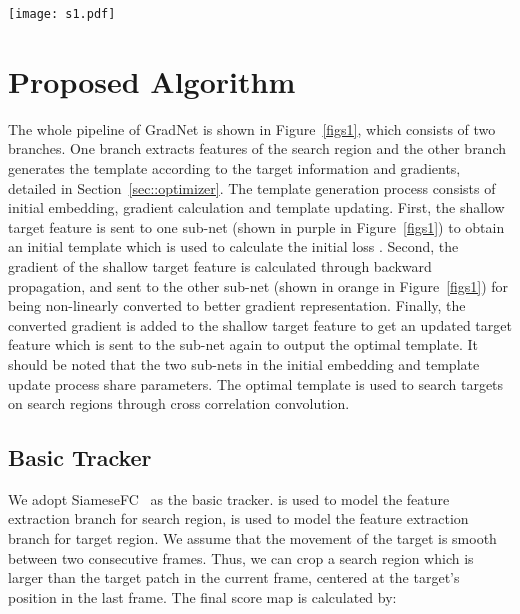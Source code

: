 \documentclass[10pt,twocolumn,letterpaper]{article}
\begin{document}
\begin{figure*}[t]
	\centering
	\texttt{[image: s1.pdf]}\\
	\caption{The pipeline of the proposed algorithm, which consists of two branches. The bottom branch extracts the feature of search region  and the top branch (named update branch) is responsible for template generation. The two purple trapezoids in the figure represent sub-nets with shared parameters; the solid and dotted line represents forward and backward propagation respectively.} \label{figs1}
\end{figure*}


\section{Proposed Algorithm}
The whole pipeline of GradNet is shown in Figure~\ref{figs1}, which consists of two branches. One branch extracts features of the search region  and the other branch generates the template according to the target information and gradients, detailed in Section~\ref{sec::optimizer}.
The template generation process consists of initial embedding, gradient calculation and template updating.
First, the shallow target feature  is sent to one sub-net  (shown in purple in Figure~\ref{figs1}) to obtain an initial template  which is used to calculate the initial loss .
Second, the gradient of the shallow target feature is calculated through backward propagation, and sent to the other sub-net  (shown in orange in Figure~\ref{figs1}) for being non-linearly converted to better gradient representation.
Finally, the converted gradient is added to the shallow target feature to get an updated target feature which is sent to the sub-net  again to output the optimal template.
It should be noted that the two sub-nets in the initial embedding and template update process share parameters.
The optimal template is used to search targets on search regions through cross correlation convolution.



\subsection{Basic Tracker}\label{sec::tracker}

We adopt SiameseFC~\cite{Bertinetto-ECCV16-SiamesFC} as the basic tracker.  is used to model the feature extraction branch for search region,  is used to model the feature extraction branch for target region.
We assume that the movement of the target is smooth between two consecutive frames. Thus,
we can crop a search region  which is larger than the target patch  in the current frame, centered at the target's position in the last frame. The final score map is calculated by:
\end{document}
